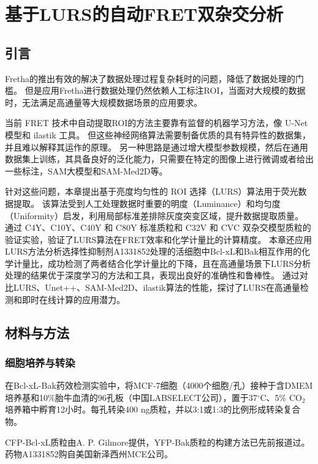 \chapter{基于LURS的自动FRET双杂交分析}

\section{引言}
Fretha的推出有效的解决了数据处理过程复杂耗时的问题，降低了数据处理的门槛。
但是应用Fretha进行数据处理仍然依赖人工标注ROI，当面对大规模的数据时，无法满足高通量等大规模数据场景的应用要求。

当前 FRET 技术中自动提取ROI的方法主要靠有监督的机器学习方法，像 U-Net 模型和 ilastik 工具。
但这些神经网络算法需要制备优质的具有特异性的数据集，并且难以解释其运作的原理。
另一种思路是通过增大模型参数规模，然后在通用数据集上训练，其具备良好的泛化能力，只需要在特定的图像上进行微调或者给出一些标注，SAM大模型和SAM-Med2D等。

针对这些问题，本章提出基于亮度均匀性的 ROI 选择（LURS）算法用于荧光数据提取。
该算法受到人工处理数据时重要的明度（Luminance）和均匀度（Uniformity）启发，利用局部标准差排除灰度突变区域，提升数据提取质量。
通过 C4Y、C10Y、C40Y 和 C80Y 标准质粒和 C32V 和 CVC 双杂交模型质粒的验证实验，验证了LURS算法在FRET效率和化学计量比的计算精度。
本章还应用LURS方法分析选择性抑制剂A1331852处理的活细胞中Bcl-xL和Bak相互作用的化学计量比，成功检测了两者结合化学计量比的下降，且在高通量场景下LURS分析处理的结果优于深度学习的方法和工具，表现出良好的准确性和鲁棒性。
通过对比LURS、Unet++、SAM-Med2D、ilastik算法的性能，探讨了LURS在高通量检测和即时在线计算的应用潜力。

\section{材料与方法}
\subsection{细胞培养与转染}
在Bcl-xL-Bak药效检测实验中，将MCF-7细胞（4000个细胞/孔）接种于含DMEM培养基和10\%胎牛血清的96孔板（中国LABSELECT公司），置于37$^\circ \text{C}$、5\% $\text{CO}_2$培养箱中孵育12小时。每孔转染400 ng质粒，并以3:1或1:3的比例形成转染复合物。

CFP-Bcl-xL质粒由A. P. Gilmore提供，YFP-Bak质粒的构建方法已先前报道过。
药物A1331852购自美国新泽西州MCE公司。


